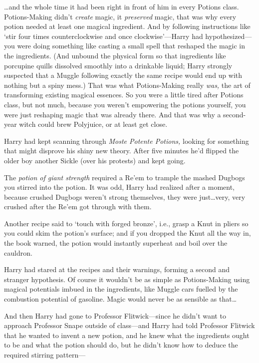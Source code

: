 …and the whole time it had been right in front of him in every Potions
class. Potions-Making didn’t \emph{create} magic, it \emph{preserved} magic,
that was why every potion needed at least one magical ingredient. And by
following instructions like ‘stir four times counterclockwise and once
clockwise’—Harry had hypothesized—you were doing something like casting a
small spell that reshaped the magic in the ingredients. (And unbound the
physical form so that ingredients like porcupine quills dissolved smoothly into
a drinkable liquid; Harry strongly suspected that a Muggle following exactly
the same recipe would end up with nothing but a spiny mess.) That was what
Potions-Making really \emph{was,} the art of transforming existing magical
essences. So you were a little tired after Potions class, but not much, because
you weren’t empowering the potions yourself, you were just reshaping magic that
was already there. And that was why a second-year witch could brew Polyjuice,
or at least get close.

Harry had kept scanning through \emph{Moste Potente Potions,} looking for
something that might disprove his shiny new theory. After five minutes he’d
flipped the older boy another Sickle (over his protests) and kept going.

The \emph{potion of giant strength} required a Re’em to trample the mashed
Dugbogs you stirred into the potion. It was odd, Harry had realized after a
moment, because crushed Dugbogs weren’t strong themselves, they were
just…very, very crushed after the Re’em got through with them.

Another recipe said to ‘touch with forged bronze’, i.e., grasp a Knut in pliers
so you could skim the potion’s surface; and if you dropped the Knut all the way
in, the book warned, the potion would instantly superheat and boil over the
cauldron.

Harry had stared at the recipes and their warnings, forming a second and
stranger hypothesis. Of course it wouldn’t be as simple as Potions-Making using
magical potentials imbued in the ingredients, like Muggle cars fuelled by the
combustion potential of gasoline. Magic would never be as sensible as
that…

And then Harry had gone to Professor Flitwick—since he didn’t want to
approach Professor Snape outside of class—and Harry had told Professor
Flitwick that he wanted to invent a new potion, and he knew what the
ingredients ought to be and what the potion should do, but he didn’t know how
to deduce the required stirring pattern—

